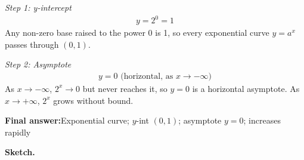 \documentclass[11pt]{article}
\begin{document}
\textit{Step 1: y-intercept}
\[\begin{gathered}
y = 2^0 = 1
\end{gathered}\]
Any non-zero base raised to the power 0 is 1, so every exponential curve \( y = a^x \) passes through \( (0, 1) \).

\textit{Step 2: Asymptote}
\[\begin{gathered}
y = 0 \text{ (horizontal, as } x \to -\infty)
\end{gathered}\]
As \( x \to -\infty \), \( 2^x \to 0 \) but never reaches it, so \( y = 0 \) is a horizontal asymptote. As \( x \to +\infty \), \( 2^x \) grows without bound.

\begin{answerbox}
\textbf{Final answer:}\quad Exponential curve; \(\displaystyle y\)-int \(\displaystyle (0,1)\); asymptote \(\displaystyle y = 0\); increases rapidly
\end{answerbox}
\textbf{Sketch.}
\end{document}
